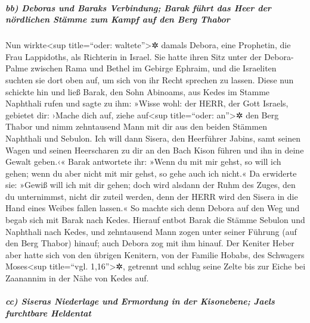 \hypertarget{bb-deboras-und-baraks-verbindung-barak-fuxfchrt-das-heer-der-nuxf6rdlichen-stuxe4mme-zum-kampf-auf-den-berg-thabor}{%
\subparagraph{bb) Deboras und Baraks Verbindung; Barak führt das Heer
der nördlichen Stämme zum Kampf auf den Berg
Thabor}\label{bb-deboras-und-baraks-verbindung-barak-fuxfchrt-das-heer-der-nuxf6rdlichen-stuxe4mme-zum-kampf-auf-den-berg-thabor}}

Nun wirkte\textless sup title=``oder:
waltete''\textgreater✲ damals Debora, eine Prophetin, die Frau
Lappidoths, als Richterin in Israel. Sie hatte ihren Sitz
unter der Debora-Palme zwischen Rama und Bethel im Gebirge Ephraim, und
die Israeliten suchten sie dort oben auf, um sich von ihr Recht sprechen
zu lassen. Diese nun schickte hin und ließ Barak, den Sohn
Abinoams, aus Kedes im Stamme Naphthali rufen und sagte zu ihm: »Wisse
wohl: der HERR, der Gott Israels, gebietet dir: ›Mache dich auf, ziehe
auf\textless sup title=``oder: an''\textgreater✲ den Berg Thabor und
nimm zehntausend Mann mit dir aus den beiden Stämmen Naphthali und
Sebulon. Ich will dann Sisera, den Heerführer Jabins, samt
seinen Wagen und seinen Heerscharen zu dir an den Bach Kison führen und
ihn in deine Gewalt geben.‹« Barak antwortete ihr: »Wenn
du mit mir gehst, so will ich gehen; wenn du aber nicht mit mir gehst,
so gehe auch ich nicht.« Da erwiderte sie: »Gewiß will ich
mit dir gehen; doch wird alsdann der Ruhm des Zuges, den du unternimmst,
nicht dir zuteil werden, denn der HERR wird den Sisera in die Hand eines
Weibes fallen lassen.« So machte sich denn Debora auf den Weg und begab
sich mit Barak nach Kedes. Hierauf entbot Barak die
Stämme Sebulon und Naphthali nach Kedes, und zehntausend Mann zogen
unter seiner Führung (auf den Berg Thabor) hinauf; auch Debora zog mit
ihm hinauf. Der Keniter Heber aber hatte sich von den
übrigen Kenitern, von der Familie Hobabs, des Schwagers
Moses\textless sup title=``vgl. 1,16''\textgreater✲, getrennt und schlug
seine Zelte bis zur Eiche bei Zaanannim in der Nähe von Kedes auf.

\hypertarget{cc-siseras-niederlage-und-ermordung-in-der-kisonebene-jaels-furchtbare-heldentat}{%
\subparagraph{cc) Siseras Niederlage und Ermordung in der Kisonebene;
Jaels furchtbare
Heldentat}\label{cc-siseras-niederlage-und-ermordung-in-der-kisonebene-jaels-furchtbare-heldentat}}

